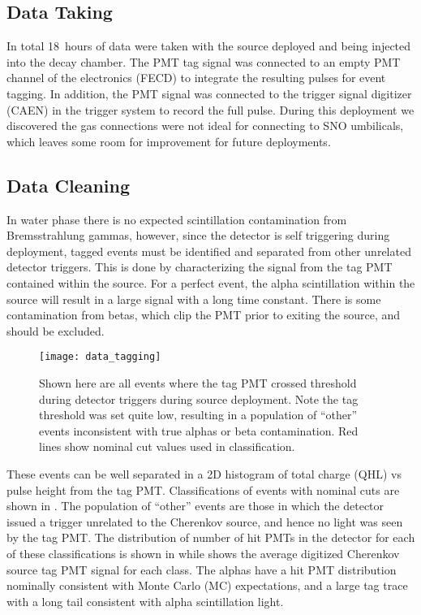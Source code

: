 \subsection{Data Taking}
In total 18~hours of data were taken with the source deployed and \Li being injected into the decay chamber.
The PMT tag signal was connected to an empty PMT channel of the {\snop} electronics (FECD) to integrate the resulting pulses for event tagging.
In addition, the PMT signal was connected to the trigger signal digitizer (CAEN) in the {\snop} trigger system to record the full pulse.
During this deployment we discovered the gas connections were not ideal for connecting to SNO umbilicals, which leaves some room for improvement for future deployments.

\subsection{Data Cleaning}
In water phase there is no expected scintillation contamination from Bremsstrahlung gammas, however, since the detector is self triggering during deployment, tagged events must be identified and separated from other unrelated detector triggers.
This is done by characterizing the signal from the tag PMT contained within the source.
For a perfect event, the alpha scintillation within the source will result in a large signal with a long time constant.
There is some contamination from \Li betas, which clip the PMT prior to exiting the source, and should be excluded.


\begin{figure}
\centering
\texttt{[image: data\_tagging]}
\caption{\label{fig:chsrc_classify} Shown here are all events where the tag PMT crossed threshold during detector triggers during source deployment. Note the tag threshold was set quite low, resulting in a population of ``other'' events inconsistent with true alphas or beta contamination. Red lines show nominal cut values used in classification.}
\end{figure}

These events can be well separated in a 2D histogram of total charge (QHL) vs pulse height from the tag PMT. 
Classifications of events with nominal cuts are shown in .
The population of ``other'' events are those in which the detector issued a trigger unrelated to the Cherenkov source, and hence no light was seen by the tag PMT.
The distribution of number of hit PMTs in the {\snop} detector for each of these classifications is shown in  while  shows the average digitized Cherenkov source tag PMT signal for each class.
The alphas have a hit PMT distribution nominally consistent with Monte Carlo (MC) expectations, and a large tag trace with a long tail consistent with alpha scintillation light.


